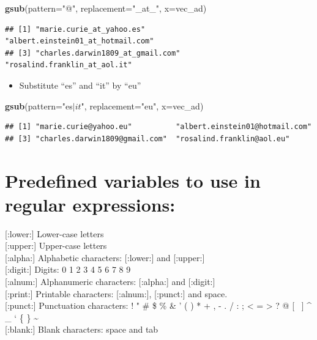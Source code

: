 \documentclass[]{book}
\newenvironment{Shaded}{\begin{snugshade}}{\end{snugshade}}
\newcommand{\DataTypeTok}[1]{\textcolor[rgb]{0.13,0.29,0.53}{#1}}
\newcommand{\KeywordTok}[1]{\textcolor[rgb]{0.13,0.29,0.53}{\textbf{#1}}}
\newcommand{\NormalTok}[1]{#1}
\newcommand{\StringTok}[1]{\textcolor[rgb]{0.31,0.60,0.02}{#1}}
\providecommand{\tightlist}{%
  \setlength{\itemsep}{0pt}\setlength{\parskip}{0pt}}
\begin{document}
\begin{Shaded}
\begin{Highlighting}[]
\KeywordTok{gsub}\NormalTok{(}\DataTypeTok{pattern=}\StringTok{"@"}\NormalTok{,}
        \DataTypeTok{replacement=}\StringTok{"_at_"}\NormalTok{,}
        \DataTypeTok{x=}\NormalTok{vec_ad)}
\end{Highlighting}
\end{Shaded}

\begin{verbatim}
## [1] "marie.curie_at_yahoo.es"          "albert.einstein01_at_hotmail.com"
## [3] "charles.darwin1809_at_gmail.com"  "rosalind.franklin_at_aol.it"
\end{verbatim}

\begin{itemize}
\tightlist
\item
  Substitute ``es'' and ``it'' by ``eu''
\end{itemize}

\begin{Shaded}
\begin{Highlighting}[]
\KeywordTok{gsub}\NormalTok{(}\DataTypeTok{pattern=}\StringTok{"es$|it$"}\NormalTok{, }
    \DataTypeTok{replacement=}\StringTok{"eu"}\NormalTok{, }
    \DataTypeTok{x=}\NormalTok{vec_ad)}
\end{Highlighting}
\end{Shaded}

\begin{verbatim}
## [1] "marie.curie@yahoo.eu"          "albert.einstein01@hotmail.com"
## [3] "charles.darwin1809@gmail.com"  "rosalind.franklin@aol.eu"
\end{verbatim}

\hypertarget{predefined-variables-to-use-in-regular-expressions}{%
\section{Predefined variables to use in regular expressions:}\label{predefined-variables-to-use-in-regular-expressions}}

{[}:lower:{]} \textbar{} Lower-case letters \textbar{}\\
{[}:upper:{]} \textbar{} Upper-case letters \textbar{}\\
{[}:alpha:{]} \textbar{} Alphabetic characters: {[}:lower:{]} and {[}:upper:{]} \textbar{}\\
{[}:digit:{]} \textbar{} Digits: 0 1 2 3 4 5 6 7 8 9 \textbar{}\\
{[}:alnum:{]} \textbar{} Alphanumeric characters: {[}:alpha:{]} and {[}:digit:{]} \textbar{}\\
{[}:print:{]} \textbar{} Printable characters: {[}:alnum:{]}, {[}:punct:{]} and space. \textbar{}\\
{[}:punct:{]} \textbar{} Punctuation characters: ! " \# \$ \% \& ' ( ) * + , - . / : ; \textless{} = \textgreater{} ? @ {[} ~{]} \^{} \_ ` \{ \textbar{} \} \textasciitilde{} \textbar{}\\
{[}:blank:{]} \textbar{} Blank characters: space and tab \textbar{}
\end{document}
